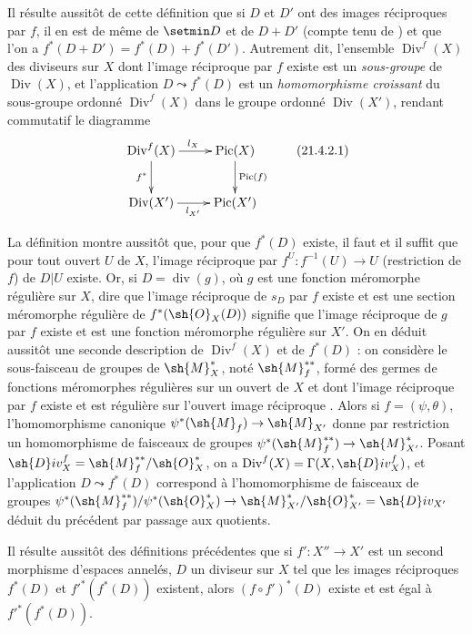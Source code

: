 Il résulte aussitôt de cette définition que si $D$ et $D'$ ont des images réciproques par $f$, il en est de même de $\setmin D$ et de $D+D'$ (compte tenu de ) et que l'on a
$f^*(D+D')=f^*(D)+f^*(D')$.
Autrement dit, l'ensemble $\operatorname{Div}^f(X)$ des diviseurs sur $X$ dont l'image réciproque par $f$ existe est un \emph{sous-groupe} de $\operatorname{Div}(X)$, et l'application $D\leadsto f^*(D)$ est un \emph{homomorphisme croissant} du sous-groupe ordonné $\operatorname{Div}^f(X)$ dans le groupe ordonné $\operatorname{Div}(X')$, rendant commutatif le diagramme
\[
\label{IV.21.4.2.1}
  \xymatrix{
    \operatorname{Div}^f(X) \ar[r]^{l_X} \ar[d]_{f^*} & \operatorname{Pic}(X) \ar[d]^{\operatorname{Pic}(f)} \\
    \operatorname{Div}(X') \ar[r]_{l_{X'}} & \operatorname{Pic}(X')
  }
  \tag{21.4.2.1}
\]

\begin{env}[21.4.3]
\label{IV.21.4.3}
La définition  montre aussitôt que, pour que $f^*(D)$ existe, il faut et il suffit que pour tout ouvert $U$ de $X$, l'image réciproque par $f^U:f^{-1}(U)\to U$ (restriction de $f$) de $D|U$ existe.
Or, si $D=\operatorname{div}(g)$, où $g$ est une fonction méromorphe régulière sur $X$, dire que l'image réciproque de $s_D$ par $f$ existe et est une section méromorphe régulière de $f^*(\sh{O}_X(D))$ signifie  que l'image réciproque de $g$ par $f$ existe et est une fonction méromorphe régulière sur $X'$.
On en déduit aussitôt une seconde description de $\operatorname{Div}^f(X)$ et de $f^*(D)$ : on considère le sous-faisceau de groupes de $\sh{M}_X^*$, noté $\sh{M}_f^{**}$, formé des germes de fonctions méromorphes régulières sur un ouvert de $X$ et dont l'image réciproque par $f$ existe et est régulière sur l'ouvert image réciproque .
Alors si $f=(\psi,\theta)$, l'homomorphisme canonique  $\psi^*(\sh{M}_f)\to\sh{M}_{X'}$ donne par restriction un homomorphisme de faisceaux de groupes $\psi^*(\sh{M}_f^{**})\to\sh{M}_{X'}^*$.
Posant $\sh{D}iv_X^f=\sh{M}_f^{**}/\sh{O}_X^*$, on a $\operatorname{Div}^f(X)=\Gamma(X,\sh{D}iv_X^f)$, et l'application $D\leadsto f^*(D)$ correspond à l'homomorphisme de faisceaux de groupes $\psi^*(\sh{M}_f^{**})/\psi^*(\sh{O}_X^*)\to\sh{M}_{X'}^*/\sh{O}_{X'}^*=\sh{D}iv_{X'}$ déduit du précédent par passage aux quotients.
\end{env}

\begin{env}[21.4.4]
Il résulte aussitôt des définitions précédentes que si $f':X''\to X'$ est un second morphisme d'espaces annelés, $D$ un diviseur sur $X$ tel que les images réciproques $f^*(D)$ et $f'^*(f^*(D))$ existent, alors $(f\circ f')^*(D)$ existe et est égal à $f'^*(f^*(D))$.
\end{env}

